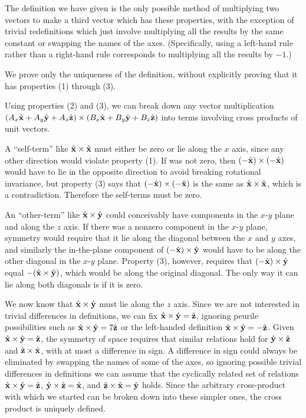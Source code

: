  The definition we have given is the only possible method of
multiplying two vectors to make a third vector which has
these properties, with the exception of trivial
redefinitions which just involve multiplying all the results
by the same constant or swapping the names of the axes.
(Specifically, using a left-hand rule rather than a
right-hand rule corresponds to multiplying all the results
by $-1$.)

 We prove only the uniqueness of the definition, without
explicitly proving that it has properties (1) through (3).

Using properties (2) and (3), we can break down any vector
multiplication
$(A_x\hat{\textbf{x}}+A_y\hat{\textbf{y}}+A_z\hat{\textbf{z}})
\times(B_x\hat{\textbf{x}}+B_y\hat{\textbf{y}}+B_z\hat{\textbf{z}})$ into terms involving
cross products of unit vectors.

A ``self-term'' like $\hat{\textbf{x}}\times\hat{\textbf{x}}$ must either be zero or lie along the $x$
axis, since any other direction would violate property (1).
If was not zero, then
$(-\hat{\textbf{x}})\times(-\hat{\textbf{x}})$
 would have to lie in the opposite direction to avoid
breaking rotational invariance, but property (3) says that 
$(-\hat{\textbf{x}})\times(-\hat{\textbf{x}})$ is the
same as $\hat{\textbf{x}}\times\hat{\textbf{x}}$, which is a contradiction.
Therefore the self-terms
must be zero.

An ``other-term'' like $\hat{\textbf{x}}\times\hat{\textbf{y}}$ could conceivably have components in
the $x$-$y$ plane and along the $z$ axis. If there was a nonzero
component in the $x$-$y$ plane, symmetry would require that it
lie along the diagonal between the $x$ and $y$ axes, and
similarly the in-the-plane component of $(-\hat{\textbf{x}})\times\hat{\textbf{y}}$  would have to
be along the other diagonal in the $x$-$y$ plane. Property (3),
however, requires that $(-\hat{\textbf{x}})\times\hat{\textbf{y}}$ equal
$-(\hat{\textbf{x}}\times\hat{\textbf{y}})$, which would be along
the original diagonal. The only way it can lie along both
diagonals is if it is zero.

We now know that $\hat{\textbf{x}}\times\hat{\textbf{y}}$
 must lie along the $z$ axis. Since we are
not interested in trivial differences in definitions, we can
fix $\hat{\textbf{x}}\times\hat{\textbf{y}}=\hat{\textbf{z}}$,
ignoring peurile possibilities such as
$\hat{\textbf{x}}\times\hat{\textbf{y}}=7\hat{\textbf{z}}$ or the
left-handed definition $\hat{\textbf{x}}\times\hat{\textbf{y}}=-\hat{\textbf{z}}$.
Given $\hat{\textbf{x}}\times\hat{\textbf{y}}=\hat{\textbf{z}}$, the symmetry of space
requires that similar relations hold for $\hat{\textbf{y}}\times\hat{\textbf{z}}$ and
$\hat{\textbf{z}}\times\hat{\textbf{x}}$, with at most
a difference in sign. A difference in sign could always be
eliminated by swapping the names of some of the axes, so
ignoring possible trivial differences in definitions we can
assume that the cyclically related set of relations  $\hat{\textbf{x}}\times\hat{\textbf{y}}=\hat{\textbf{z}}$,
 $\hat{\textbf{y}}\times\hat{\textbf{z}}=\hat{\textbf{x}}$, and  $\hat{\textbf{z}}\times\hat{\textbf{x}}=\hat{\textbf{y}}$
holds. Since the arbitrary cross-product with which we
started can be broken down into these simpler ones, the
cross product is uniquely defined.

